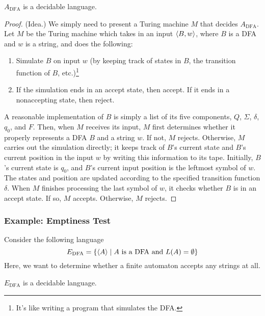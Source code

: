 \documentclass[letterpaper]{article}
\begin{document}
\begin{theorem}{}{}
    $A_{\text{DFA}}$ is a decidable language. 
\end{theorem}

\begin{mdframed}[]
    \begin{proof}
        (Idea.) We simply need to present a Turing machine $M$ that decides $A_{\text{DFA}}$. Let $M$ be the Turing machine which takes in an input $\langle B, w \rangle$, where $B$ is a DFA and $w$ is a string, and does the following: 
        \begin{enumerate}
            \item Simulate $B$ on input $w$ (by keeping track of states in $B$, the transition function of $B$, etc.)\footnote{It's like writing a program that simulates the DFA.}
            \item If the simulation ends in an accept state, then accept. If it ends in a nonaccepting state, then reject. 
        \end{enumerate}
        A reasonable implementation of $B$ is simply a list of its five components, $Q$, $\Sigma$, $\delta$, $q_0$, and $F$. Then, when $M$ receives its input, $M$ first determines whether it properly represents a DFA $B$ and a string $w$. If not, $M$ rejects. Otherwise, $M$ carries out the simulation directly; it keeps track of $B$'s current state and $B$'s current position in the input $w$ by writing this information to its tape. Initially, $B$'s current state is $q_0$, and $B$'s current input position is the leftmost symbol of $w$. The states and position are updated according to the specified transition function $\delta$. When $M$ finishes processing the last symbol of $w$, it checks whether $B$ is in an accept state. If so, $M$ accepts. Otherwise, $M$ rejects.
    \end{proof}
\end{mdframed}

\subsubsection{Example: Emptiness Test}
Consider the following language
\[E_{\text{DFA}} = \{\langle A \rangle \mid A \text{ is a DFA and } L(A) = \emptyset\}\]
Here, we want to determine whether a finite automaton accepts any strings at all. 

\begin{theorem}{}{}
    $E_{\text{DFA}}$ is a decidable language.
\end{theorem}
\end{document}
